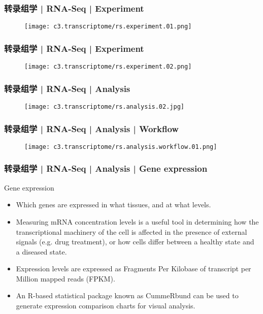 \begin{frame}
  \frametitle{转录组学 | RNA-Seq | Experiment}
  \begin{figure}
    \centering
    \texttt{[image: c3.transcriptome/rs.experiment.01.png]}
  \end{figure}
\end{frame}

\begin{frame}
  \frametitle{转录组学 | RNA-Seq | Experiment}
  \begin{figure}
    \centering
    \texttt{[image: c3.transcriptome/rs.experiment.02.png]}
  \end{figure}
\end{frame}

\begin{frame}
  \frametitle{转录组学 | RNA-Seq | Analysis}
  \begin{figure}
    \centering
    \texttt{[image: c3.transcriptome/rs.analysis.02.jpg]}
  \end{figure}
\end{frame}

\begin{frame}
  \frametitle{转录组学 | RNA-Seq | Analysis | Workflow}
  \begin{figure}
    \centering
    \texttt{[image: c3.transcriptome/rs.analysis.workflow.01.png]}
  \end{figure}
\end{frame}

\begin{frame}
  \frametitle{转录组学 | RNA-Seq | Analysis | Gene expression}
  \begin{block}{Gene expression}
    \begin{itemize}
      \item Which genes are expressed in what tissues, and at what levels.
      \item Measuring mRNA concentration levels is a useful tool in determining how the transcriptional machinery of the cell is affected in the presence of external signals (e.g. drug treatment), or how cells differ between a healthy state and a diseased state.
      \item Expression levels are expressed as Fragments Per Kilobase of transcript per Million mapped reads (FPKM).
      \item An R-based statistical package known as CummeRbund can be used to generate expression comparison charts for visual analysis.
    \end{itemize}
  \end{block}
\end{frame}


